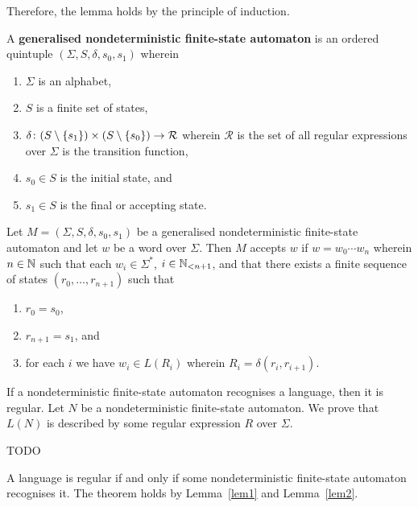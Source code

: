     Therefore, the lemma holds by the principle of induction.
\Epr

\Bdf
    A {\bf generalised nondeterministic finite-state automaton} is an ordered
    quintuple \((\varSigma, S, \delta, s_0, s_1)\) wherein
    \begin{enumerate}
        \item \(\varSigma\) is an alphabet,
        \item \(S\) is a finite set of states,
        \item \(\map{\delta}{(S \setminus \set{s_1}) \times (S \setminus
        \set{s_0})}{\mathcal{R}}\) wherein \(\mathcal{R}\) is the set of all
        regular expressions over \(\varSigma\) is the transition function,
        \item \(s_0 \in S\) is the initial state, and
        \item \(s_1 \in S\) is the final or accepting state.
    \end{enumerate}
\Edf

Let \(M = (\varSigma, S, \delta, s_0, s_1)\) be a generalised nondeterministic
finite-state automaton and let \(w\) be a word over \(\varSigma\). Then \(M\)
accepts \(w\) if \(w = w_0 \cdots w_n\) wherein \(n \in \setnat\) such that each
\(w_i \in \varSigma^*\), \(i \in \Nln[n + 1]\), and that there exists a finite
sequence of states \((r_0, \ldots, r_{n + 1})\) such that
\begin{enumerate}
    \item \(r_0 = s_0\),
    \item \(r_{n + 1} = s_1\), and
    \item for each \(i\) we have \(w_i \in L(R_i)\) wherein \(R_i = \delta(r_i,
    r_{i + 1})\).
\end{enumerate}

\Blm
    \label{lem2}
    If a nondeterministic finite-state automaton recognises a language, then it
    is regular.
\Elm
\Bpr
    Let \(N\) be a nondeterministic finite-state automaton. We prove that
    \(L(N)\) is described by some regular expression \(R\) over \(\varSigma\).

    TODO
\Epr

\Bth
    A language is regular if and only if some nondeterministic finite-state
    automaton recognises it.
\Eth
\Bpr
    The theorem holds by Lemma~\ref{lem1} and Lemma~\ref{lem2}.
\Epr

\Edc